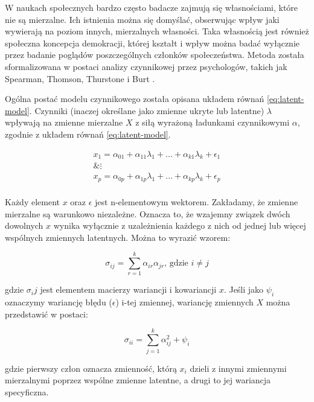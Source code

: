 \documentclass[12pt]{article}
\begin{document}
W naukach społecznych bardzo często badacze zajmują się własnościami, które nie są mierzalne. Ich istnienia można się domyślać, obserwując wpływ jaki wywierają na poziom innych, mierzalnych własności. Taka własnością jest również społeczna koncepcja demokracji, której kształt i wpływ można badać wyłącznie przez badanie poglądów poszczególnych członków społeczeństwa. Metoda została sformalizowana w postaci analizy czynnikowej przez psychologów, takich jak Spearman, Thomson, Thurstone i Burt \citep{Everitt}.

Ogólna postać modelu czynnikowego została opisana układem równań \ref{eq:latent-model}. Czynniki (inaczej określane jako zmienne ukryte lub latentne) \(\lambda\) wpływają na zmienne mierzalne \(X\) z siłą wyrażoną ładunkami czynnikowymi \(\alpha\), zgodnie z układem równań \ref{eq:latent-model}.

\begin{equation}
\label{eq:latent-model}
\begin{aligned} 
x_1 = \alpha_{01} + \alpha_{11} \lambda_1 + ... + \alpha_{k1} \lambda_k + \epsilon_1\\
\& \vdots \\
x_p = \alpha_{0p} + \alpha_{1p} \lambda_1 + ... + \alpha_{kp} \lambda_k + \epsilon_p\\
\end{aligned}
\end{equation}

Każdy element \(x\) oraz \(\epsilon\) jest n-elementowym wektorem. Zakładamy, że zmienne mierzalne są warunkowo niezależne. Oznacza to, że wzajemny związek dwóch dowolnych \(x\) wynika wyłącznie z uzależnienia każdego z nich od jednej lub więcej wspólnych zmiennych latentnych. Można to wyrazić wzorem:

\begin{equation}
\label{eq:shared-var}
\sigma_{ij} = \sum_{r=1}^k \alpha_{ir} \alpha_{jr} \text{, gdzie } i \neq j
\end{equation}

gdzie \(\sigma_ij\) jest elementem macierzy wariancji i kowariancji \(x\).
Jeśli jako \(\psi_i\) oznaczymy wariancję błędu (\(\epsilon\)) i-tej zmiennej, wariancję zmiennych \(X\) można przedstawić w postaci:

\begin{equation}
\label{eq:spec-var}
\sigma_{ii} = \sum_{j=1}^k \alpha_{ij}^2 + \psi_i
\end{equation}

gdzie pierwszy człon oznacza zmienność, którą \(x_i\) dzieli z innymi zmiennymi mierzalnymi poprzez wspólne zmienne latentne, a drugi to jej wariancja specyficzna.
\end{document}
